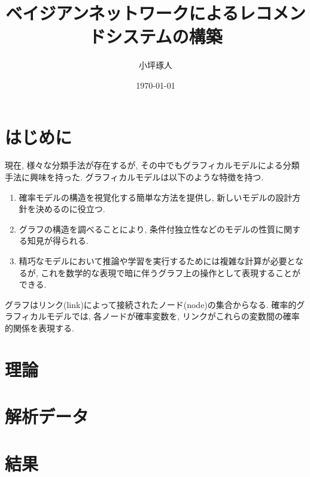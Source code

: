 \documentclass[a4j,12pt]{jarticle}
\title{ベイジアンネットワークによるレコメンドシステムの構築}   %
\author{小坪琢人}   %
\date{\today}   %
\begin{document}
\maketitle   %
\setlength{\baselineskip}{20pt}   %
\tableofcontents   %
\listoffigures   %
\listoftables   %
\clearpage   %


\section{はじめに}

現在, 様々な分類手法が存在するが, その中でもグラフィカルモデルによる分類手法に興味を持った. グラフィカルモデルは以下のような特徴を持つ.~\cite{Bishop2}

\begin{enumerate}

\item 確率モデルの構造を視覚化する簡単な方法を提供し, 新しいモデルの設計方針を決めるのに役立つ.

\item グラフの構造を調べることにより, 条件付独立性などのモデルの性質に関する知見が得られる.

\item 精巧なモデルにおいて推論や学習を実行するためには複雑な計算が必要となるが, これを数学的な表現で暗に伴うグラフ上の操作として表現することができる.

\end{enumerate}

グラフはリンク(link)によって接続されたノード(node)の集合からなる. 確率的グラフィカルモデルでは, 各ノードが確率変数を, リンクがこれらの変数間の確率的関係を表現する. 

\section{理論}



\section{解析データ}

\section{結果}
\end{document}
